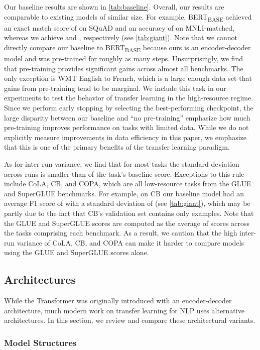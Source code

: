 \documentclass[twoside,11pt]{article}
\begin{document}
Our baseline results are shown in \cref{tab:baseline}.
Overall, our results are comparable to existing models of similar size.
For example, BERT\textsubscript{BASE} achieved an exact match score of  on SQuAD and an accuracy of  on MNLI-matched, whereas we achieve  and , respectively (see \cref{tab:giant}).
Note that we cannot directly compare our baseline to BERT\textsubscript{BASE} because ours is an encoder-decoder model and was pre-trained for roughly  as many steps.
Unsurprisingly, we find that pre-training provides significant gains across almost all benchmarks.
The only exception is WMT English to French, which is a large enough data set that gains from pre-training tend to be marginal.
We include this task in our experiments to test the behavior of transfer learning in the high-resource regime.
Since we perform early stopping by selecting the best-performing checkpoint, the large disparity between our baseline and ``no pre-training'' emphasize how much pre-training improves performance on tasks with limited data.
While we do not explicitly measure improvements in data efficiency in this paper, we emphasize that this is one of the primary benefits of the transfer learning paradigm.

As for inter-run variance, we find that for most tasks the standard deviation across runs is smaller than  of the task's baseline score.
Exceptions to this rule include CoLA, CB, and COPA, which are all low-resource tasks from the GLUE and SuperGLUE benchmarks.
For example, on CB our baseline model had an average F1 score of  with a standard deviation of  (see \cref{tab:giant}), which may be partly due to the fact that CB's validation set contains only  examples.
Note that the GLUE and SuperGLUE scores are computed as the average of scores across the tasks comprising each benchmark.
As a result, we caution that the high inter-run variance of CoLA, CB, and COPA can make it harder to compare models using the GLUE and SuperGLUE scores alone.

\subsection{Architectures}
\label{sec:architectures}

While the Transformer was originally introduced with an encoder-decoder architecture, much modern work on transfer learning for NLP uses alternative architectures.
In this section, we review and compare these architectural variants.

\subsubsection{Model Structures}
\label{sec:structures}
\end{document}

